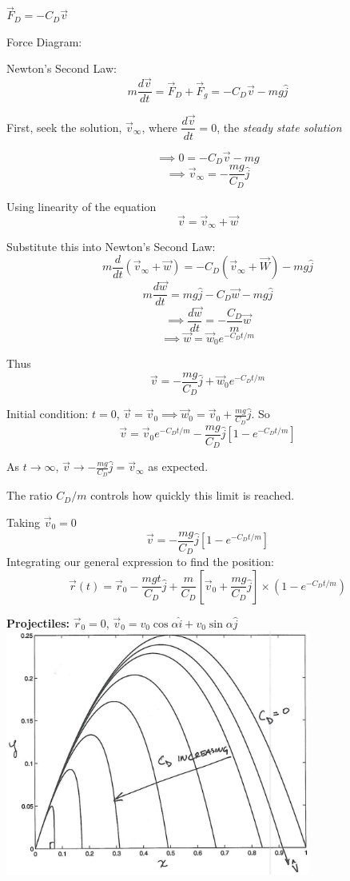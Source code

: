 \begin{example}
\vspace*{80pt}	

$\vec{F}_D = -C_D\vec{v}$

Force Diagram:

\vspace*{80pt}	


Newton's Second Law:
\[m\frac{d\vec{v}}{dt} = \vec{F}_D + \vec{F}_g = -C_D\vec{v} - mg\hat{j}\]

First, seek the solution, $\vec{v}_{\infty}$, where $\dfrac{d\vec{v}}{dt} = 0$, the \emph{steady state solution}

\[\implies 0 =  -C_D\vec{v} - mg\]
\[\implies \vec{v}_{\infty} = -\frac{mg}{C_D}\hat{j}\]

Using linearity of the equation
\[\vec{v} = \vec{v}_{\infty} + \vec{w}\]

Substitute this into Newton's Second Law:
\[m\frac{d}{dt}(\vec{v}_{\infty} + \vec{w}) = -C_D(\vec{v}_{\infty} + \vec{W}) - mg\hat{j}\]
\[m\frac{d\vec{w}}{dt} = mg\hat{j} -C_D\vec{w} - mg\hat{j}\]
\[\implies \frac{d\vec{w}}{dt} = -\frac{C_D}{m}\vec{w} \]
\[\implies \vec{w} = \vec{w}_0e^{-C_Dt/m}\]

Thus 
\[\vec{v} = -\frac{mg}{C_D}\hat{j} + \vec{w}_0e^{-C_Dt/m}\]

Initial condition: $t= 0$, $\vec{v} = \vec{v}_0 \implies \vec{w}_0 = \vec{v}_0 + \frac{mg}{C_D}\hat{j}$. So
\[\vec{v} = \vec{v}_0e^{-C_Dt/m} - \frac{mg}{C_D}\hat{j}[1-e^{-C_Dt/m}]\]

As $t \to \infty$, $\vec{v} \to -\frac{mg}{C_D}\hat{j} = \vec{v}_{\infty}$ as expected.

The ratio $C_D/m$ controls how quickly this limit is reached. 

Taking $\vec{v}_0 = 0$
\[\vec{v} = -\frac{mg}{C_D}\hat{j}[1 - e^{-C_Dt/m}]\]
\vspace*{100pt}
Integrating our general expression to find the position:
\[\vec{r}(t) = \vec{r}_0 - \frac{mgt}{C_D}\hat{j} + \frac{m}{C_D}[\vec{v}_0 + \frac{mg}{C_D}\hat{j}]\times(1-e^{-C_Dt/m})\]

\textbf{Projectiles:} $\vec{r}_0 = 0$, $\vec{v}_0 = v_0\cos\alpha\hat{i} + v_0\sin\alpha\hat{j}$\\[1cm]


\hspace*{2cm}\includegraphics[width=10cm]{drag.jpg}
\end{example}


